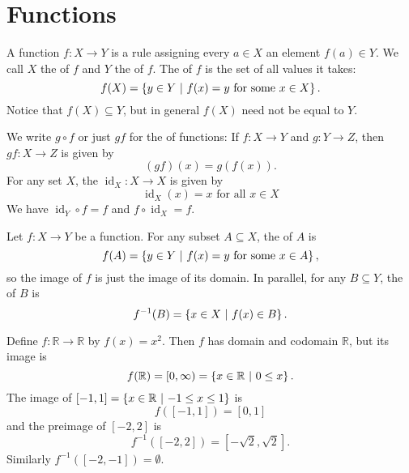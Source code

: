 \documentclass[titlepage=false]{sl2art}
\newcommand{\RR}{\mathbb{R}}
\newcommand{\id}{\operatorname{id}}
\newcommand{\set}[1]{\left\{ \def\given{\ \middle| \ }  #1 \right\}  }
\begin{document}
\section{Functions}
\begin{definition}
  A function \(f : X \to Y\) is a rule%
  assigning every \(a \in X\) an element \(f(a) \in Y\).
  We call \(X\) the  of \(f\) and \(Y\) the  of \(f\).
  The  of \(f\) is the set of all values it takes:
  \[
    f(X) = \set{y \in Y \given f(x) = y \text{ for some } x \in X}.
  \]
  Notice that \(f(X) \subseteq Y\), but in general \(f(X)\) need not be equal to \(Y\).

  We write \(g \circ f\) or just \(gf\) for the  of functions:
  If \(f : X \to Y\) and \(g : Y \to Z\), then \(gf : X \to Z\) is given by
  \[
    (gf)(x) = g(f(x)).
  \]
  For any set \(X\), the  \(\id_X : X \to X\) is given by
  \[
    \id_{X}(x) = x \text{ for all } x \in X
  \]
  We have \(\id_Y \circ f = f\) and \(f \circ \id_X = f\).
\end{definition}

\begin{definition}
  Let \(f : X \to Y\) be a function.
  For any subset \(A \subseteq X\), the  of \(A\) is
  \[
    f(A) = \set{y \in Y \given f(x) = y \text{ for some } x \in A},
  \]
  so the image of \(f\) is just the image of its domain.
  In parallel, for any \(B \subseteq Y\), the  of \(B\) is%
  \[
    f^{-1}(B) = \set{x \in X \given f(x) \in B}.
  \]
\end{definition}
\begin{example}
  Define \(f : \RR \to \RR\) by \(f(x) = x^2\).
  Then \(f\) has domain and codomain \(\RR\), but its image is
  \[
    f(\RR) = [0,\infty) = \set{x \in \RR \given 0 \le x }.
  \]
  The image of \([-1,1] = \set{x \in \RR \given -1 \le x \le 1}\) is
  \[
    f([-1,1]) = [0,1]
  \]
  and the preimage of \([-2,2]\) is
  \[
    f^{-1}([-2,2]) = [-\sqrt 2, \sqrt 2].
  \]
  Similarly \(f^{-1}([-2,-1]) = \emptyset\).
\end{example}
\end{document}
